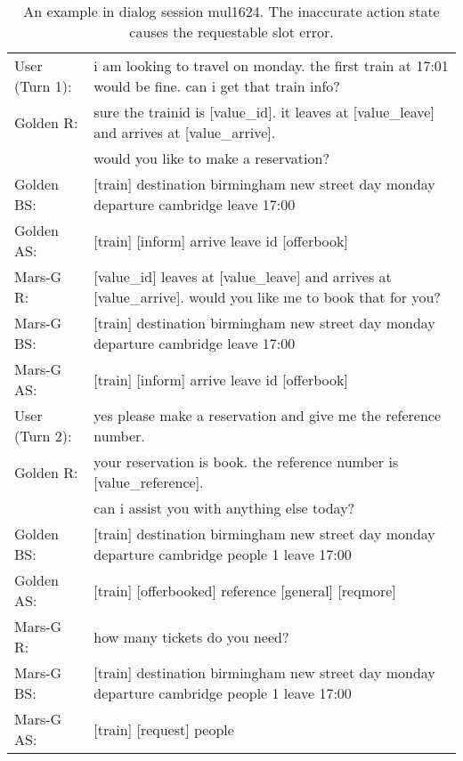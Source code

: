 \begin{table*}[ht]
{\begin{tabular}{ll}
  	 
  	 	\midrule
  	 	User (Turn 1):   &i am looking to travel on monday. the first train at 17:01 would be fine.  can i get that train info?\\
  	 	  Golden R: & sure the trainid is [value\_id]. it leaves at [value\_leave] and arrives at [value\_arrive].\\& would you like to make a reservation?\\
  	 	 	Golden BS:  & [train] destination birmingham new street day monday departure cambridge leave 17:00 \\
  	 	 	Golden AS:&   [train] [inform] arrive leave id [offerbook]  \\
  	 	     Mars-G R: &[value\_id] leaves at [value\_leave] and arrives at [value\_arrive]. would you like me to book that for you?\\
  	 	 Mars-G BS:  & [train] destination birmingham new street day monday departure cambridge leave 17:00\\
  Mars-G AS:&   [train] [inform] arrive leave id [offerbook]   \\
   	 	\midrule
  	 	User (Turn 2):   &yes please make a reservation and give me the reference number.\\
  	 	  Golden R: & your reservation is book. the reference number is [value\_reference].\\& can i assist you with anything else today?\\
  	 	 	Golden BS:  &  [train] destination birmingham new street day monday departure cambridge people 1 leave 17:00 \\
  	 	 	Golden AS:&   [train]  {\color{red}[offerbooked] reference} [general] [reqmore]  \\
  	 	     Mars-G R: &how many tickets do you need?\\
  	 	 Mars-G BS:  &[train] destination birmingham new street day monday departure cambridge  {\color{red}people 1} leave 17:00 \\
  Mars-G AS:&    [train]  {\color{red}[request] people}  \\   
		\bottomrule
	\end{tabular}}\caption{An example in dialog session mul1624. The inaccurate action state causes the requestable slot error. \label{tab:case5}}
\end{table*}

